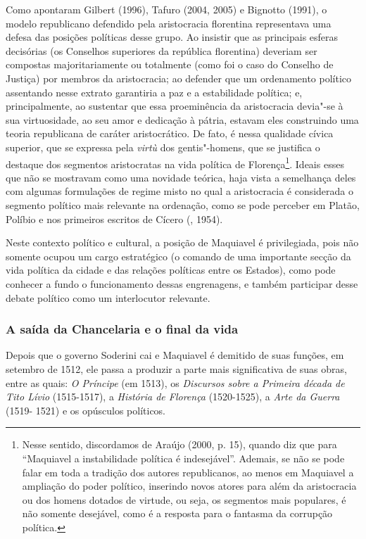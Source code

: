 Como apontaram Gilbert (1996), Tafuro (2004, 2005) e Bignotto (1991), o
modelo republicano defendido pela aristocracia florentina representava
uma defesa das posições políticas desse grupo. Ao insistir que as
principais esferas decisórias (os Conselhos superiores da república
florentina) deveriam ser compostas majoritariamente ou totalmente (como
foi o caso do Conselho de Justiça) por membros da aristocracia; ao
defender que um ordenamento político assentando nesse extrato garantiria
a paz e a estabilidade política; e, principalmente, ao sustentar que
essa proeminência da aristocracia devia"-se à sua virtuosidade, ao seu
amor e dedicação à pátria, estavam eles construindo uma teoria
republicana de caráter aristocrático. De fato, é nessa qualidade cívica
superior, que se expressa pela \emph{virtù} dos gentis"-homens, que se
justifica o destaque dos segmentos aristocratas na vida política de
Florença\footnote{Nesse sentido, discordamos de Araújo (2000, p. 15),
  quando diz que para ``Maquiavel a instabilidade política é
  indesejável''. Ademais, se não se pode falar em toda a tradição dos
  autores republicanos, ao menos em Maquiavel a ampliação do poder
  político, inserindo novos atores para além da aristocracia ou dos
  homens dotados de virtude, ou seja, os segmentos mais populares, é não
  somente desejável, como é a resposta para o fantasma da corrupção
  política.}. Ideais esses que não se mostravam como uma novidade
teórica, haja vista a semelhança deles com algumas formulações de regime
misto no qual a aristocracia é considerada o segmento político mais
relevante na ordenação, como se pode perceber em Platão, Políbio e nos
primeiros escritos de Cícero (, 1954).

Neste contexto político e cultural, a posição de Maquiavel é
privilegiada, pois não somente ocupou um cargo estratégico (o comando de
uma importante secção da vida política da cidade e das relações
políticas entre os Estados), como pode conhecer a fundo o funcionamento
dessas engrenagens, e também participar desse debate político como um
interlocutor relevante.

\subsubsection{A saída da Chancelaria e o final da vida}

Depois que o governo Soderini cai e Maquiavel é demitido de suas
funções, em setembro de 1512, ele passa a produzir a parte mais
significativa de suas obras, entre as quais: \emph{O Príncipe} (em
1513), os \emph{Discursos sobre a Primeira década de Tito Lívio}
(1515-1517), a \emph{História de Florença} (1520-1525), a \emph{Arte da
Guerra} (1519- 1521) e os opúsculos políticos.


